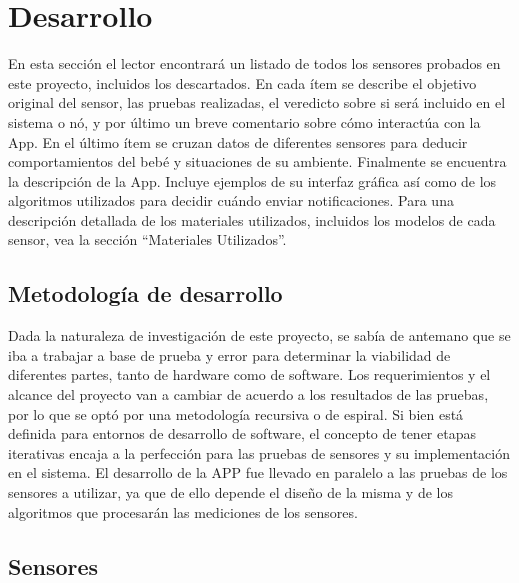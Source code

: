 \documentclass{IEEEtran}
\begin{document}
	\section{Desarrollo}

		En esta sección el lector encontrará un listado de todos los sensores probados en este proyecto, incluidos los descartados. En cada ítem se describe el objetivo original del sensor, las pruebas realizadas, el veredicto sobre si será incluido en el sistema o nó, y por último un breve comentario sobre cómo interactúa con la App.
En el último ítem se cruzan datos de diferentes sensores para deducir comportamientos del bebé y situaciones de su ambiente.
Finalmente se encuentra la descripción de la App. Incluye ejemplos de su interfaz gráfica así como de los algoritmos utilizados para decidir cuándo enviar notificaciones.
Para una descripción detallada de los materiales utilizados, incluidos los modelos de cada sensor, vea la sección “Materiales Utilizados”.

		\subsection{Metodología de desarrollo}

			Dada la naturaleza de investigación de este proyecto, se sabía de antemano que se iba a trabajar a base de prueba y error para determinar la viabilidad de diferentes partes, tanto de hardware como de software. Los requerimientos y el alcance del proyecto van a cambiar de acuerdo a los resultados de las pruebas, por lo que se optó por una metodología recursiva o de espiral.
Si bien está definida para entornos de desarrollo de software, el concepto de tener etapas iterativas encaja a la perfección para las pruebas de sensores y su implementación en el sistema. El desarrollo de la APP fue llevado en paralelo a las pruebas de los sensores a utilizar, ya que de ello depende el diseño de la misma y de los algoritmos que procesarán las mediciones de los sensores.

		\subsection{Sensores}
\end{document}
